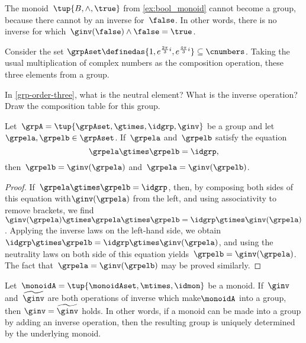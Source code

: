 \begin{example}
  The monoid~$\tup{B,\wedge, \true}$ from \cref{ex:bool_monoid} cannot become a group, because there cannot by an inverse for~$\false$. In other words, there is no inverse for which~$\ginv(\false)\wedge \false=\true$.
\end{example}
\begin{example}
  \label{grp-order-three}
  Consider the set $\grpAset \definedas \{ 1, e^{\frac{2\pi}{3} i}, e^{\frac{4\pi }{3}i}  \} \subseteq \cnumbers$.
  Taking the usual multiplication of complex numbers as the composition operation, these three elements from a group.
\end{example}

\begin{gradedexercise}
  In \cref{grp-order-three}, what is the neutral element? What is the inverse operation?
  Draw the composition table for this group.
\end{gradedexercise}


\begin{lemma}
 \label{lem:inv-op-unique}
Let~$\grpA = \tup{ \grpAset, \gtimes, \idgrp, \ginv }$ be a group and let~$\grpela, \grpelb \in \grpAset$. If~$\grpela$ and~$\grpelb$ satisfy the equation
\begin{equation}
\grpela \gtimes \grpelb = \idgrp,
\end{equation}
then~$\grpelb = \ginv( \grpela )$ and~$\grpela = \ginv(\grpelb)$.
\end{lemma}

\begin{proof}
If~$\grpela \gtimes \grpelb = \idgrp$, then, by composing both sides of this equation with$\ginv(\grpela)$ from the left, and using associativity to remove brackets, we find ~$\ginv(\grpela) \gtimes \grpela \gtimes \grpelb = \idgrp \gtimes \ginv(\grpela)$.
Applying the inverse laws on the left-hand side, we obtain~$\idgrp \gtimes \grpelb = \idgrp \gtimes \ginv(\grpela)$, and using the neutrality laws on both side of this equation yields~$\grpelb =  \ginv(\grpela)$.
The fact that~$\grpela = \ginv(\grpelb)$ may be proved similarly.
\end{proof}


\begin{corollary}
 \label{cor:inv-op-unique}
Let~$\monoidA = \tup{\monoidAset, \mtimes,  \idmon }$ be a monoid.
 If~$\ginv$ and~$\widetilde \ginv$ are both operations of inverse which make$\monoidA$ into a group, then $\ginv = \widetilde \ginv$ holds.
 In other words, if a monoid can be made into a group by adding an inverse operation, then the resulting group is uniquely determined by the underlying monoid.
\end{corollary}

